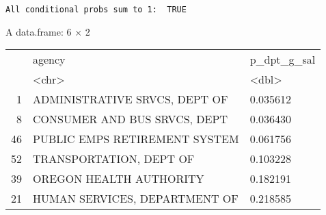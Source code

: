 \documentclass[11pt]{article}
\begin{document}
    \begin{Verbatim}[commandchars=\\\{\}]
All conditional probs sum to 1:  TRUE
    \end{Verbatim}

    A data.frame: 6 × 2
\begin{tabular}{r|ll}
  & agency & p\_dpt\_g\_sal\\
  & <chr> & <dbl>\\
\hline
	1 & ADMINISTRATIVE SRVCS, DEPT OF & 0.035612\\
	8 & CONSUMER AND BUS SRVCS, DEPT  & 0.036430\\
	46 & PUBLIC EMPS RETIREMENT SYSTEM & 0.061756\\
	52 & TRANSPORTATION, DEPT OF       & 0.103228\\
	39 & OREGON HEALTH AUTHORITY       & 0.182191\\
	21 & HUMAN SERVICES, DEPARTMENT OF & 0.218585\\
\end{tabular}
\end{document}
